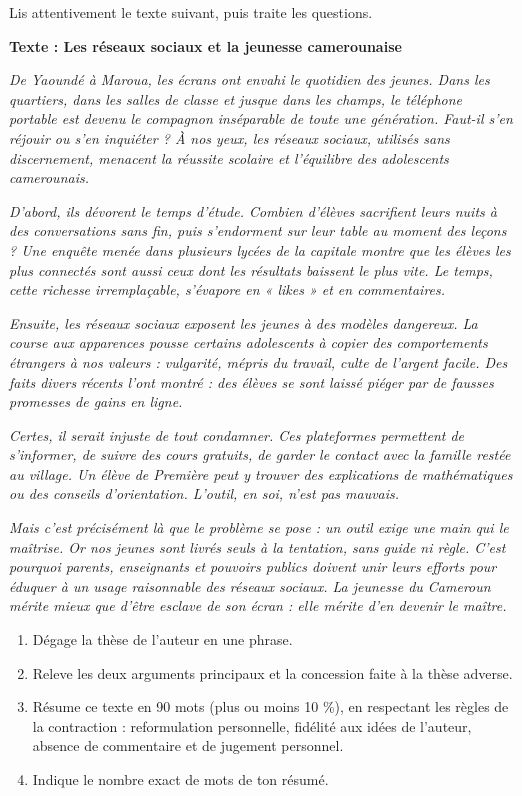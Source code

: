 \documentclass[11pt]{article}
\begin{document}
\begin{exercice}
Lis attentivement le texte suivant, puis traite les questions.

\textbf{Texte : Les réseaux sociaux et la jeunesse camerounaise}

\emph{De Yaoundé à Maroua, les écrans ont envahi le quotidien des jeunes. Dans les quartiers, dans les salles de classe et jusque dans les champs, le téléphone portable est devenu le compagnon inséparable de toute une génération. Faut-il s'en réjouir ou s'en inquiéter ? À nos yeux, les réseaux sociaux, utilisés sans discernement, menacent la réussite scolaire et l'équilibre des adolescents camerounais.}

\emph{D'abord, ils dévorent le temps d'étude. Combien d'élèves sacrifient leurs nuits à des conversations sans fin, puis s'endorment sur leur table au moment des leçons ? Une enquête menée dans plusieurs lycées de la capitale montre que les élèves les plus connectés sont aussi ceux dont les résultats baissent le plus vite. Le temps, cette richesse irremplaçable, s'évapore en « likes » et en commentaires.}

\emph{Ensuite, les réseaux sociaux exposent les jeunes à des modèles dangereux. La course aux apparences pousse certains adolescents à copier des comportements étrangers à nos valeurs : vulgarité, mépris du travail, culte de l'argent facile. Des faits divers récents l'ont montré : des élèves se sont laissé piéger par de fausses promesses de gains en ligne.}

\emph{Certes, il serait injuste de tout condamner. Ces plateformes permettent de s'informer, de suivre des cours gratuits, de garder le contact avec la famille restée au village. Un élève de Première peut y trouver des explications de mathématiques ou des conseils d'orientation. L'outil, en soi, n'est pas mauvais.}

\emph{Mais c'est précisément là que le problème se pose : un outil exige une main qui le maîtrise. Or nos jeunes sont livrés seuls à la tentation, sans guide ni règle. C'est pourquoi parents, enseignants et pouvoirs publics doivent unir leurs efforts pour éduquer à un usage raisonnable des réseaux sociaux. La jeunesse du Cameroun mérite mieux que d'être esclave de son écran : elle mérite d'en devenir le maître.}

\begin{enumerate}
\item Dégage la thèse de l'auteur en une phrase.
\item Releve les deux arguments principaux et la concession faite à la thèse adverse.
\item Résume ce texte en 90 mots (plus ou moins 10 \%), en respectant les règles de la contraction : reformulation personnelle, fidélité aux idées de l'auteur, absence de commentaire et de jugement personnel.
\item Indique le nombre exact de mots de ton résumé.
\end{enumerate}
\end{exercice}
\end{document}

